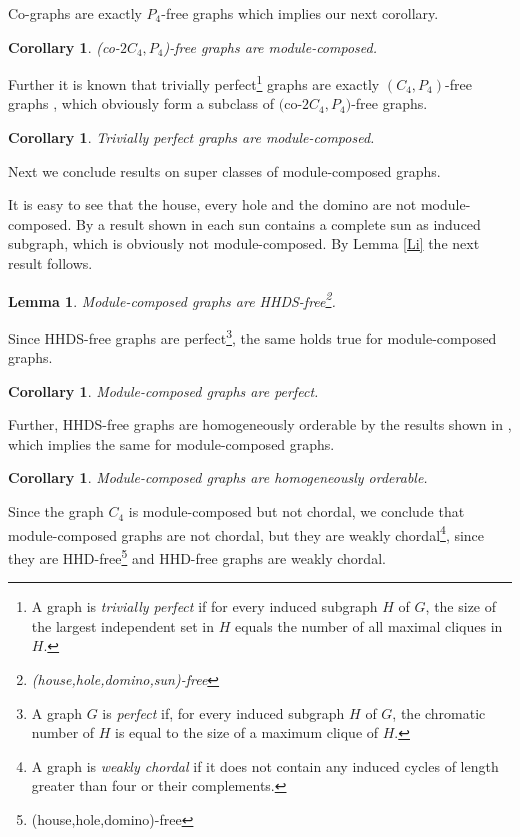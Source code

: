 \documentclass[11pt]{article}
\newtheorem{corollary}[theorem]{Corollary}
\newtheorem{lemma}[theorem]{Lemma}
\begin{document}
Co-graphs are exactly $P_4$-free graphs which implies our next corollary.

\begin{corollary}
(co-$2C_4,P_4$)-free graphs are module-composed.
\end{corollary}


Further it is  known that trivially perfect\footnote{
A graph is {\em trivially perfect} if for every induced subgraph $H$ of $G$,
the size of the largest independent set in $H$ equals the number of  all maximal cliques in $H$.} graphs are exactly  $(C_4,P_4)$-free graphs
\cite{Gol78}, which obviously form a subclass of $($co-$2C_4,P_4)$-free graphs.



\begin{corollary}
Trivially perfect graphs are module-composed.
\end{corollary}






Next we conclude results on super classes
of module-composed graphs.

It is easy to see that the house, every hole and the domino are not module-composed.
By a result shown in \cite{Far83} each sun contains a complete sun as induced subgraph, which
is obviously not module-composed. By  Lemma \ref{Li} the next result follows.  


\begin{lemma}
Module-composed graphs are HHDS-free\footnote{(house,hole,domino,sun)-free}.
\end{lemma}


Since HHDS-free graphs are perfect\footnote{A graph $G$ is {\em perfect} if, for every induced subgraph $H$ of $G$, the chromatic number of $H$ is equal to the size of a maximum clique of $H$.}, the same holds true for module-composed graphs.

\begin{corollary}
Module-composed graphs are perfect.
\end{corollary}

Further, HHDS-free graphs are homogeneously orderable  by the results shown in \cite{BDN97}, which implies the same for module-composed graphs.

\begin{corollary}
Module-composed graphs are homogeneously orderable.
\end{corollary}


Since the graph $C_4$ is module-composed but not chordal, we conclude that 
module-composed graphs are not chordal, but they are weakly chordal\footnote{A graph is {\em weakly chordal} if it does not 
contain any induced cycles of length greater than four or their complements.}, since they
are HHD-free\footnote{(house,hole,domino)-free} and HHD-free graphs are weakly chordal.
\end{document}
